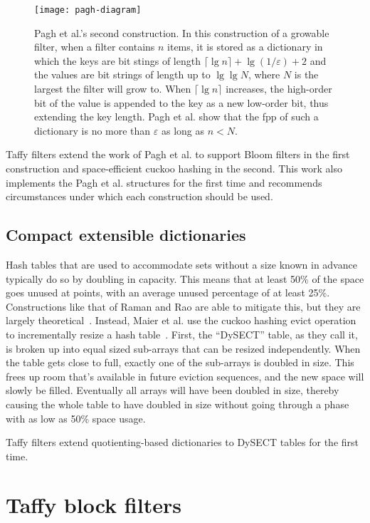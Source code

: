 \documentclass[letterpaper,twocolumn,10pt]{article}
\newcommand{\etal}{et al.}
\begin{document}
\begin{figure}
\texttt{[image: pagh-diagram]}
\caption{\label{pagh-diagram}
Pagh \etal{}'s second construction.
In this construction of a growable filter, when a filter contains $n$ items, it is stored as a dictionary in which the keys are bit stings of length $\lceil \lg n \rceil + \lg (1/\varepsilon) + 2$ and the values are bit strings of length up to $\lg \lg N$, where $N$ is the largest the filter will grow to.
When $\lceil \lg n \rceil$ increases, the high-order bit of the value is appended to the key as a new low-order bit, thus extending the key length.
Pagh \etal{} show that the fpp of such a dictionary is no more than $\varepsilon$ as long as $n < N$.
}
\end{figure}

Taffy filters extend the work of Pagh \etal{} to support Bloom filters in the first construction and space-efficient cuckoo hashing in the second.
This work also implements the Pagh \etal{} structures for the first time and recommends circumstances under which each construction should be used.

\subsection{Compact extensible dictionaries}

Hash tables that are used to accommodate sets without a size known in advance typically do so by doubling in capacity.
This means that at least 50\% of the space goes unused at points, with an average unused percentage of at least 25\%.
Constructions like that of Raman and Rao are able to mitigate this, but they are largely theoretical~\cite{succinct}.
Instead, Maier \etal{} use the cuckoo hashing evict operation to incrementally resize a hash table~\cite{dysect}.
First, the ``DySECT'' table, as they call it, is broken up into equal sized sub-arrays that can be resized independently.
When the table gets close to full, exactly one of the sub-arrays is doubled in size.
This frees up room that's available in future eviction sequences, and the new space will slowly be filled.
Eventually all arrays will have been doubled in size, thereby causing the whole table to have doubled in size without going through a phase with as low as 50\% space usage.

Taffy filters extend quotienting-based dictionaries to DySECT tables for the first time.

\section{Taffy block filters}
\label{pbf}
\end{document}
